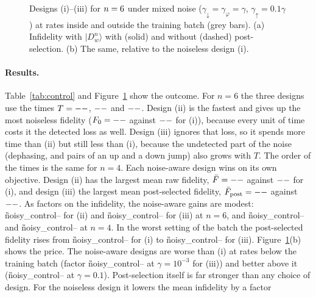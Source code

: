\begin{figure}[t]
\centering{}
\caption{Designs (i)--(iii) for $n=6$ under mixed noise
($\gamma_\downarrow=\gamma_\varphi=\gamma$, $\gamma_\uparrow=0.1\gamma$) at rates inside and outside the training batch
(grey bars). (a) Infidelity with $|D^n_w\rangle$ with (solid) and without (dashed) post-selection. (b) The same,
relative to the noiseless design (i).}
\label{fig:control}
\end{figure}

\paragraph{Results.} Table~\ref{tab:control} and Figure~\ref{fig:control} show the outcome. For $n=6$ the three
designs use the times $T=\G{noisy_control}{\NCSixTOne}{--}$, $\G{noisy_control}{\NCSixTTwo}{--}$ and
$\G{noisy_control}{\NCSixTThree}{--}$. Design (ii) is the fastest and gives up the most noiseless fidelity
($F_0=\G{noisy_control}{\NCSixFZeroTwo}{--}$ against $\G{noisy_control}{\NCSixFZeroOne}{--}$ for (i)), because every
unit of time costs it the detected loss as well. Design (iii) ignores that loss, so it spends more time than (ii) but
still less than (i), because the undetected part of the noise (dephasing, and pairs of an up and a down jump) also
grows with $T$. The order of the times is
the same for $n=4$. Each noise-aware design wins on its own objective. Design (ii) has the largest mean raw fidelity,
$\bar F=\G{noisy_control}{\NCSixFTwo}{--}$ against $\G{noisy_control}{\NCSixFOne}{--}$ for (i), and design (iii) the
largest mean post-selected fidelity, $\bar F_{\mathrm{post}}=\G{noisy_control}{\NCSixFPostThree}{--}$ against
$\G{noisy_control}{\NCSixFPostOne}{--}$. As factors on the infidelity, the noise-aware gains are modest:
\G{noisy_control}{\NCSixGainRaw}{--} for (ii) and \G{noisy_control}{\NCSixGainPost}{--} for (iii) at $n=6$, and
\G{noisy_control}{\NCFourGainRaw}{--} and \G{noisy_control}{\NCFourGainPost}{--} at $n=4$. In the worst setting of
the batch the post-selected fidelity rises from \G{noisy_control}{\NCSixMinFPostOne}{--} for (i) to
\G{noisy_control}{\NCSixMinFPostThree}{--} for (iii). Figure~\ref{fig:control}(b) shows the price. The noise-aware
designs are worse than (i) at rates below the training batch (factor \G{noisy_control}{\NCSixRatioLow}{--} at
$\gamma=10^{-3}$ for (iii)) and better above it (\G{noisy_control}{\NCSixRatioHigh}{--} at $\gamma=0.1$). Post-selection
itself is far stronger than any choice of design. For the noiseless design it lowers the mean infidelity by a factor
